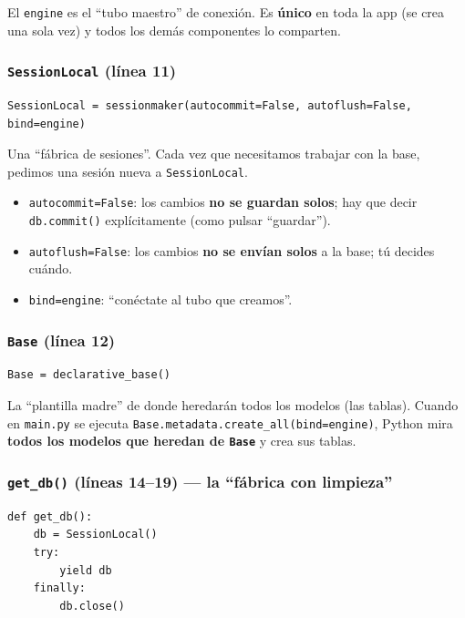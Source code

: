 \documentclass[11pt,a4paper]{article}
\begin{document}
El \texttt{engine} es el ``tubo maestro'' de conexión. Es \textbf{único} en toda la app
(se crea una sola vez) y todos los demás componentes lo comparten.

\subsubsection{\texttt{SessionLocal} (línea 11)}

\begin{lstlisting}
SessionLocal = sessionmaker(autocommit=False, autoflush=False, bind=engine)
\end{lstlisting}

Una ``fábrica de sesiones''. Cada vez que necesitamos trabajar con la base, pedimos una
sesión nueva a \texttt{SessionLocal}.

\begin{itemize}
    \item \texttt{autocommit=False}: los cambios \textbf{no se guardan solos}; hay que decir
    \texttt{db.commit()} explícitamente (como pulsar ``guardar'').
    \item \texttt{autoflush=False}: los cambios \textbf{no se envían solos} a la base; tú decides cuándo.
    \item \texttt{bind=engine}: ``conéctate al tubo que creamos''.
\end{itemize}

\subsubsection{\texttt{Base} (línea 12)}

\begin{lstlisting}
Base = declarative_base()
\end{lstlisting}

La ``plantilla madre'' de donde heredarán todos los modelos (las tablas). Cuando en
\texttt{main.py} se ejecuta \texttt{Base.metadata.create\_all(bind=engine)}, Python mira
\textbf{todos los modelos que heredan de \texttt{Base}} y crea sus tablas.

\subsubsection{\texttt{get\_db()} (líneas 14--19) --- la ``fábrica con limpieza''}

\begin{lstlisting}
def get_db():
    db = SessionLocal()
    try:
        yield db
    finally:
        db.close()
\end{lstlisting}
\end{document}
